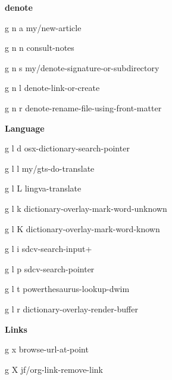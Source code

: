 \documentclass[10pt]{article}
\renewcommand\subsection[1]{\smallskip\par\textbf{\color{heading}#1}}
\begin{document}
\begin{multicols}{4}
  \subsection{denote}
  \begin{keylist}
    \item[g n a] my/new-article
    \item[g n n] consult-notes
    \item[g n s] my/denote-signature-or-subdirectory
    \item[g n l] denote-link-or-create
    \item[g n r] denote-rename-file-using-front-matter
  \end{keylist}

  \subsection{Language}
  \begin{keylist}
    \item[g l d] osx-dictionary-search-pointer
    \item[g l l] my/gts-do-translate
    \item[g l L] lingva-translate
    \item[g l k] dictionary-overlay-mark-word-unknown
    \item[g l K] dictionary-overlay-mark-word-known
    \item[g l i] sdcv-search-input+
    \item[g l p] sdcv-search-pointer
    \item[g l t] powerthesaurus-lookup-dwim
    \item[g l r] dictionary-overlay-render-buffer
  \end{keylist}
  \subsection{Links}
  \begin{keylist}
    \item[g x] browse-url-at-point
    \item[g X] jf/org-link-remove-link
  \end{keylist}
\end{multicols}
\end{document}

